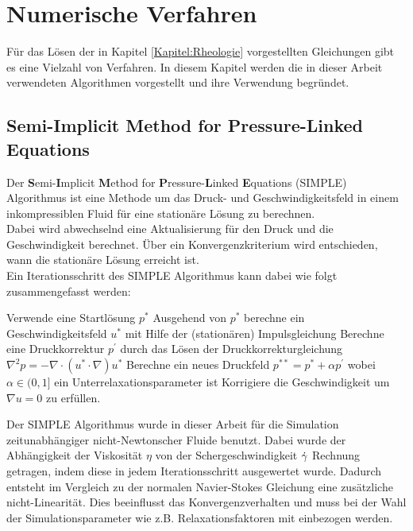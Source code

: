 \section{Numerische Verfahren}
\label{Kapitel:Numerik}
Für das Lösen der in Kapitel \ref{Kapitel:Rheologie} vorgestellten Gleichungen gibt es eine Vielzahl von Verfahren. In diesem Kapitel werden die in dieser Arbeit verwendeten Algorithmen vorgestellt und ihre Verwendung begründet.

\subsection{Semi-Implicit Method for Pressure-Linked Equations}
Der \textbf{S}emi-\textbf{I}mplicit \textbf{M}ethod for \textbf{P}ressure-\textbf{L}inked \textbf{E}quations (SIMPLE) Algorithmus  ist eine Methode um das Druck- und Geschwindigkeitsfeld in einem inkompressiblen Fluid für eine stationäre Lösung zu berechnen.\\
Dabei wird abwechselnd eine Aktualisierung für den Druck und die Geschwindigkeit berechnet. Über ein Konvergenzkriterium wird entschieden, wann die stationäre Lösung erreicht ist.\\
Ein Iterationsschritt des SIMPLE Algorithmus kann dabei wie folgt zusammengefasst werden:
\begin{outline}[enumerate]
    \1 Verwende eine Startlösung $p^*$
    \1 Ausgehend von $p^*$ berechne ein Geschwindigkeitsfeld $u^*$ mit Hilfe der (stationären) Impulsgleichung
    \1 Berechne eine Druckkorrektur $p^{'}$ durch das Lösen der Druckkorrekturgleichung $\nabla^2p=-\nabla \cdot \left( u^*\cdot\nabla \right)u^*$
    \1 Berechne ein neues Druckfeld $p^{**}=p^*+\alpha p^{'}$ wobei $\alpha \in (0,1]$ ein Unterrelaxationsparameter ist
    \1 Korrigiere die Geschwindigkeit um $\nabla u=0$ zu erfüllen.
\end{outline}

Der SIMPLE Algorithmus wurde in dieser Arbeit für die Simulation zeitunabhängiger nicht-Newtonscher Fluide benutzt. Dabei wurde der Abhängigkeit der Viskosität $\eta$ von der Schergeschwindigkeit $\dot\gamma$ Rechnung getragen, indem diese in jedem Iterationsschritt ausgewertet wurde. Dadurch entsteht im Vergleich zu der normalen Navier-Stokes Gleichung eine zusätzliche nicht-Linearität. Dies beeinflusst das Konvergenzverhalten und muss bei der Wahl der Simulationsparameter wie z.B. Relaxationsfaktoren mit einbezogen werden.


